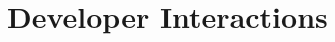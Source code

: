 \documentclass[sigconf]{acmart}
\begin{document}
%
%
%
%
%

\section{Developer Interactions}
\label{sec:algorithm}
%
\end{document}
